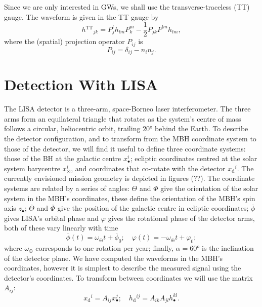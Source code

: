 \documentclass[a4paper, 11pt, titlepage, twoside]{report}
\newcommand{\sub}[1]{\ensuremath{_\mathrm{#1}}}
\newcommand{\super}[1]{\ensuremath{^\mathrm{#1}}}
\newcommand{\recip}[1]{\ensuremath{\frac{1}{#1}}}
\begin{document}
{Since we are only interested in GWs, we shall use the transverse-traceless (TT) gauge. The waveform is given in the TT gauge by\cite{Misner1973}
\begin{equation}
{h\super{TT}}_{jk} = P^l_jh_{lm}P^m_k - \recip{2}P_{jk}P^{lm}h_{lm},
\end{equation}
where the (spatial) projection operator $P_{ij}$ is
\begin{equation}
P_{ij} = \delta_{ij} - n_in_j.
\end{equation}

\section{Detection With LISA}

The LISA detector is a three-arm, space-Borneo laser interferometer\cite{Bender1998, Danzmann2003}. The three arms form an equilateral triangle that rotates as the system's centre of mass follows a circular, heliocentric orbit, trailing $\ang{20}$ behind the Earth. To describe the detector configuration, and to transform from the MBH coordinate system to those of the detector, we will find it useful to define three coordinate systems: those of the BH at the galactic centre $x_\bullet^i$; ecliptic coordinates centred at the solar system barycentre $x_\odot^i$, and coordinates that co-rotate with the detector $x\sub{d}^i$. The currently envisioned mission geometry is depicted in figures (??). The coordinate systems are related by a series of angles: $\Theta$ and $\Phi$ give the orientation of the solar system in the MBH's coordinates, these define the orientation of the MBH's spin axis $z_\bullet$; $\overline{\Theta}$ and $\overline{\Phi}$ give the position of the galactic centre in ecliptic coordinates; $\overline{\phi}$ gives LISA's orbital phase and $\varphi$ gives the rotational phase of the detector arms, both of these vary linearly with time
\begin{equation}
\overline{\phi}(t) = \omega_\oplus t + \overline{\phi}_0; \quad \varphi(t) = -\omega_\oplus t + \varphi_0;
\end{equation}
where $\omega_\oplus$ corresponds to one rotation per year; finally, $\alpha = \ang{60}$ is the inclination of the detector plane. We have computed the waveforms in the MBH's coordinates, however it is simplest to describe the measured signal using the detector's coordinates. To transform between coordinates we will use the matrix $A_{ij}$:
\begin{equation}
x\sub{d}^i = A_{ij}x_\bullet^j; \quad h\sub{d}^{ij} = A_{ik}A_{jl}h_\bullet^{kl}.

\end{equation}}
\end{document}
